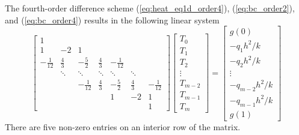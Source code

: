 \documentclass{article}
\begin{document}
The fourth-order difference scheme (\ref{eq:heat_eq1d_order4}), (\ref{eq:bc_order2}), and (\ref{eq:bc_order4}) 
results in the following linear system
\begin{equation*}
    \begin{bmatrix}
    1 \\
    1  & -2  & 1 \\
    -\frac{1}{12} & \frac{4}{3} & -\frac{5}{2} & \frac{4}{3} & -\frac{1}{12} \\
          & \ddots & \ddots & \ddots & \ddots & \ddots \\ 
          &        & -\frac{1}{12} & \frac{4}{3} & -\frac{5}{2} & \frac{4}{3} & -\frac{1}{12} \\
          &        &               &             &   1          &     -2      &     1  \\
          &        &               &             &              &             &     1
    \end{bmatrix}
    \begin{bmatrix}
    T_0 \\ T_1 \\ T_2 \\ \vdots \\ T_{m-2} \\ T_{m-1} \\ T_m
    \end{bmatrix}
    =
    \begin{bmatrix}
    g(0) \\ -q_1 h^2/k \\ -q_2 h^2/k \\ \vdots \\ -q_{m-2}h^2/k \\ -q_{m-1} h^2/k \\ g(1)
    \end{bmatrix}    
\end{equation*}
There are five non-zero entries on an interior row of the matrix.
\end{document}
